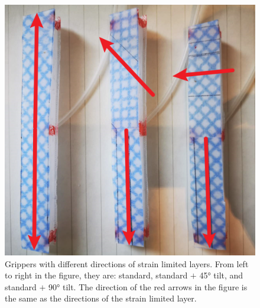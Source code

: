 \documentclass[conference]{IEEEtran}
\begin{document}
\begin{figure}
    \centering
    \includegraphics[width = 0.85\linewidth]{pics/实验示意图1.png}
    \caption{Grippers with different directions of strain limited layers. From left to right in the figure, they are: standard, standard $+$ 45° tilt, and standard $+$ 90° tilt. The direction of the red arrows in the figure is the same as the directions of the strain limited layer.}
    \label{fig:Grippers}
\end{figure}
\end{document}
